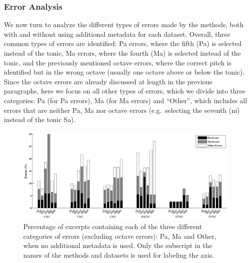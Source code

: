 {\subsubsection{Error Analysis}
\label{sec:pre_processing_tonic_identification_error_analysis}

We now turn to analyze the different types of errors made by the methods, both with and without using additional metadata for each dataset. Overall, three common types of errors are identified: Pa errors, where the fifth (Pa) is selected instead of the tonic, Ma errors, where the fourth (Ma) is selected instead of the tonic, and the previously mentioned octave errors, where the correct pitch is identified but in the wrong octave (usually one octave above or below the
tonic). Since the octave errors are already discussed at length in the previous paragraphs, here we focus on all other types of errors, which we divide into three categories: Pa (for Pa errors), Ma (for Ma errors) and ``Other'', which includes all errors that are neither Pa, Ma nor octave errors (e.g.~selecting the seventh (\gls{ni}) instead of the tonic Sa).


\begin{figure}
	\begin{center}
		\includegraphics[width=\figSizeHundred]{ch05_preprocessing/figures/ErrorAnalysis_Without_MF.pdf}
	\end{center}
	\caption[Percentage of Pa, Ma and `Other' type errors in tonic identification]{Percentage of excerpts containing each of the three different categories of errors (excluding octave errors): Pa, Ma and Other, when no additional metadata is used. Only the subscript in the names of the methods and datasets is used for labeling the axis.}
	\label{fig:tonic_identification_errors_without_MF}
\end{figure}

}
